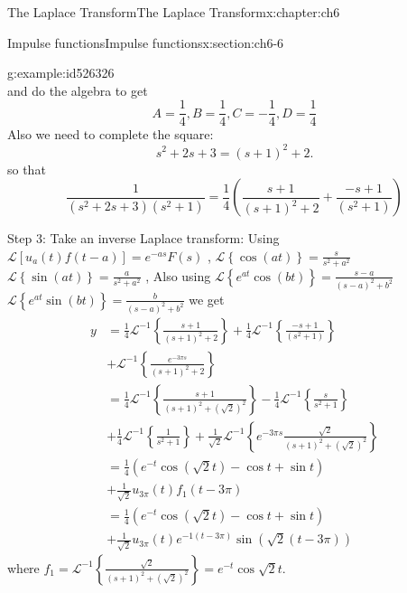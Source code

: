 \documentclass[oneside,10pt,]{book}
\numberwithin{equation}{section}
\numberwithin{equation}{section}
\newcommand{\amp}{&}
\begin{document}
\begin{chapterptx}{The Laplace Transform}{}{The Laplace Transform}{}{}{x:chapter:ch6}
\begin{sectionptx}{Impulse functions}{}{Impulse functions}{}{}{x:section:ch6-6}
\begin{example}{}{g:example:id526326}
\begin{equation*}
\end{equation*}
and do the algebra to get%
\begin{equation*}
A=\frac{1}{4},B=\frac{1}{4},C=-\frac{1}{4},D=\frac{1}{4}
\end{equation*}
Also we need to complete the square:%
\begin{equation*}
s^{2}+2s+3=\left(s+1\right)^{2}+2.
\end{equation*}
so that%
\begin{equation*}
\frac{1}{\left(s^{2}+2s+3\right)\left(s^{2}+1\right)}=\frac{1}{4}\left(\frac{s+1}{\left(s+1\right)^{2}+2}+\frac{-s+1}{\left(s^{2}+1\right)}\right)
\end{equation*}
%
\par
Step 3: Take an inverse Laplace transform: Using \(\mathcal{L}\left[u_{a}(t)f(t-a)\right]=e^{-as}F(s)\) , \(\mathcal{L}\left\{ \cos(at)\right\} =\frac{s}{s^{2}+a^{2}}\) \(\mathcal{L}\left\{ \sin(at)\right\} =\frac{a}{s^{2}+a^{2}}\) , Also using \(\mathcal{L}\left\{ e^{at}\cos(bt)\right\} =\frac{s-a}{(s-a)^{2}+b^{2}}\) \(\mathcal{L}\left\{ e^{at}\sin(bt)\right\} =\frac{b}{(s-a)^{2}+b^{2}}\) we get%
\begin{align*}
y \amp =\frac{1}{4}\mathcal{L}^{-1}\left\{ \frac{s+1}{\left(s+1\right)^{2}+2}\right\} +\frac{1}{4}\mathcal{L}^{-1}\left\{ \frac{-s+1}{\left(s^{2}+1\right)}\right\} \\
\amp +\mathcal{L}^{-1}\left\{ \frac{e^{-3\pi s}}{\left(s+1\right)^{2}+2}\right\} \\
\amp =\frac{1}{4}\mathcal{L}^{-1}\left\{ \frac{s+1}{\left(s+1\right)^{2}+\left(\sqrt{2}\right)^{2}}\right\} -\frac{1}{4}\mathcal{L}^{-1}\left\{ \frac{s}{s^{2}+1}\right\} \\
\amp +\frac{1}{4}\mathcal{L}^{-1}\left\{ \frac{1}{s^{2}+1}\right\} +\frac{1}{\sqrt{2}}\mathcal{L}^{-1}\left\{ e^{-3\pi s}\frac{\sqrt{2}}{\left(s+1\right)^{2}+\left(\sqrt{2}\right)^{2}}\right\} \\
\amp =\frac{1}{4}\left(e^{-t}\cos\left(\sqrt{2}t\right)-\cos t+\sin t\right)\\
\amp +\frac{1}{\sqrt{2}}u_{3\pi}\left(t\right)f_{1}\left(t-3\pi\right)\\
\amp =\frac{1}{4}\left(e^{-t}\cos\left(\sqrt{2}t\right)-\cos t+\sin t\right)\\
\amp +\frac{1}{\sqrt{2}}u_{3\pi}\left(t\right)e^{-1\left(t-3\pi\right)}\sin\left(\sqrt{2}\left(t-3\pi\right)\right)
\end{align*}
where \(f_{1}=\mathcal{L}^{-1}\left\{ \frac{\sqrt{2}}{\left(s+1\right)^{2}+\left(\sqrt{2}\right)^{2}}\right\} =e^{-t}\cos\sqrt{2}t\).%

\end{example}
\end{sectionptx}
\end{chapterptx}
\end{document}
